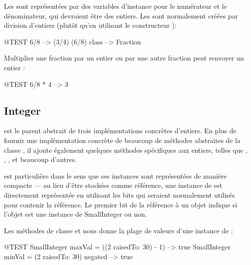 \documentclass[a4paper,10pt,twoside]{book}
\begin{document}
Les  sont repr\'esent\'ees par des variables d'instance pour le num\'erateur et le d\'enominateur, qui devraient \^etre des entiers. Les  sont normalement cr\'e\'ees par division d'entiers (plut\^ot qu'en utilisant le constructeur ):

\begin{code}{@TEST}
6/8             --> (3/4)
(6/8) class --> Fraction
\end{code}

Multiplier une fraction par un entier ou par une autre fraction peut renvoyer un entier :

\begin{code}{@TEST}
6/8 * 4 --> 3
\end{code}


\subsection{Integer}

 est le parent abstrait de trois impl\'ementations concr\`etes d'entiers. En plus de fournir une impl\'ementation concr\`ete de beaucoup de m\'ethodes abstraites de la classe , il ajoute \'egalement quelques m\'ethodes sp\'ecifiques aux entiers, telles que , , ,  et beaucoup d'autres.

 est particuli\`ere dans le sens que ses instances sont repr\'esent\'ees de mani\`ere compacte --- au lieu d'\^etre stock\'ees comme r\'ef\'erence, une instance de  est directement repr\'esent\'ee en utilisant les bits qui seraient normalement utilis\'es pour contenir la r\'ef\'erence.  Le premier bit de la r\'ef\'erence \`a un objet indique si l'objet est une instance de SmallInteger ou non.

Les m\'ethodes de classe  et  nous donne la plage de valeurs d'une instance de :

\begin{code}{@TEST}
SmallInteger maxVal = ((2 raisedTo: 30) - 1)      --> true
SmallInteger minVal = (2 raisedTo: 30) negated --> true
\end{code}
\end{document}
